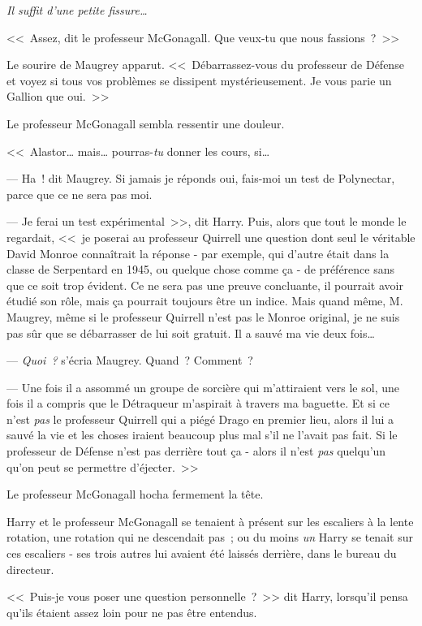 \emph{Il suffit d'une petite fissure…}

<<~Assez, dit le professeur McGonagall. Que veux-tu que nous fassions~?~>>

Le sourire de Maugrey apparut. <<~Débarrassez-vous du professeur de Défense et voyez si tous vos problèmes se dissipent mystérieusement. Je vous parie un Gallion que oui.~>>

Le professeur McGonagall sembla ressentir une douleur. 

<<~Alastor… mais… pourras-\emph{tu} donner les cours, si…

--- Ha~! dit Maugrey. Si jamais je réponds oui, fais-moi un test de Polynectar, parce que ce ne sera pas moi.

--- Je ferai un test expérimental~>>, dit Harry. Puis, alors que tout le monde le regardait, <<~je poserai au professeur Quirrell une question dont seul le véritable David Monroe connaîtrait la réponse - par exemple, qui d'autre était dans la classe de Serpentard en 1945, ou quelque chose comme ça - de préférence sans que ce soit trop évident. Ce ne sera pas une preuve concluante, il pourrait avoir étudié son rôle, mais ça pourrait toujours être un indice. Mais quand même, M. Maugrey, même si le professeur Quirrell n'est pas le Monroe original, je ne suis pas sûr que se débarrasser de lui soit gratuit. Il a sauvé ma vie deux fois…

--- \emph{Quoi~?} s'écria Maugrey. Quand~? Comment~?

--- Une fois il a assommé un groupe de sorcière qui m'attiraient vers le sol, une fois il a compris que le Détraqueur m'aspirait à travers ma baguette. Et si ce n'est \emph{pas} le professeur Quirrell qui a piégé Drago en premier lieu, alors il lui a sauvé la vie et les choses iraient beaucoup plus mal s'il ne l'avait pas fait. Si le professeur de Défense n'est pas derrière tout ça - alors il n'est \emph{pas} quelqu'un qu'on peut se permettre d'éjecter.~>>

Le professeur McGonagall hocha fermement la tête.


Harry et le professeur McGonagall se tenaient à présent sur les escaliers à la lente rotation, une rotation qui ne descendait pas~; ou du moins \emph{un} Harry se tenait sur ces escaliers - ses trois autres lui avaient été laissés derrière, dans le bureau du directeur.

<<~Puis-je vous poser une question personnelle~?~>> dit Harry, lorsqu'il pensa qu'ils étaient assez loin pour ne pas être entendus.

